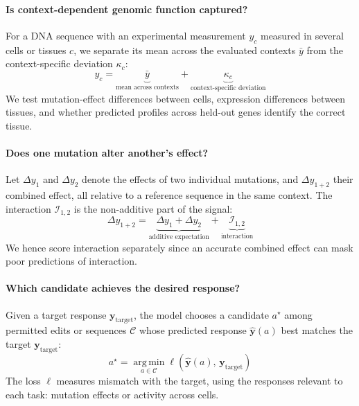 \paragraph{ Is context-dependent genomic function captured?} %
For a DNA sequence with an experimental measurement $y_c$ measured in several cells or tissues $c$, we separate its mean across the evaluated contexts $\bar y$ from the context-specific deviation $\kappa_c$:
\begin{equation}
    y_c
    =
    \underbrace{\bar y}_{\text{mean across contexts}}
    +
    \underbrace{\kappa_c}_{\text{context-specific deviation}}
    \label{eq:context}
\end{equation}
We test mutation-effect differences between cells, expression differences between
tissues, and whether predicted profiles across held-out genes identify
the correct tissue.


\paragraph{ Does one mutation alter another's effect?}
Let $\Delta y_1$ and $\Delta y_2$ denote the effects of two
individual mutations, and $\Delta y_{1+2}$ their combined effect,
all relative to a reference sequence in the same context.
The interaction $\mathcal I_{1,2}$ is the non-additive part of the signal:
\begin{equation}
    \Delta y_{1+2}
    =
    \underbrace{\Delta y_1+\Delta y_2}_{\text{additive expectation}}
    +
    \underbrace{\mathcal I_{1,2}}_{\text{interaction}}
    \label{eq:compose}
\end{equation}
We hence score interaction separately since an accurate combined effect can
mask poor predictions of interaction.

\paragraph{ Which candidate achieves the desired response?}
Given a target response $\mathbf y_{\mathrm{target}}$, the model chooses a candidate $a^\star$
among permitted edits or sequences $\mathcal C$  whose predicted response $\widehat{\mathbf y}(a)$ best matches the target $\mathbf y_{\mathrm{target}}$:
\begin{equation}
    a^\star
    =
    \operatorname*{arg\,min}_{a\in\mathcal C}
    \ell\!\left(
        \widehat{\mathbf y}(a),\,
        \mathbf y_{\mathrm{target}}
    \right)
    \label{eq:control}
\end{equation}
The loss $\ell$ measures mismatch with the target, using the
responses relevant to each task: mutation effects or activity
across cells.

